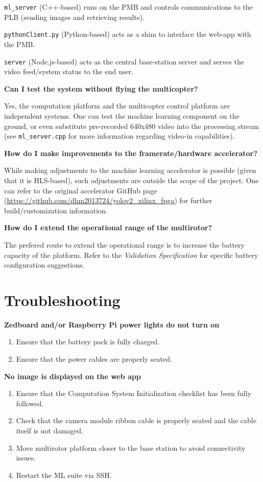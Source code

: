 \documentclass[10pt,letterpaper]{article}
\begin{document}
\texttt{ml\_server} (C++-based) runs on the PMB and controls communications to the PLB (sending images and retrieving results).

\texttt{pythonClient.py} (Python-based) acts as a shim to interface the web-app with the PMB.

\texttt{server} (Node.js-based) acts as the central base-station server and serves the video feed/system status to the end user.

\textbf{Can I test the system without flying the multicopter?}

Yes, the computation platform and the multicopter control platform are independent systems. One can test the machine learning component on the ground, or even substitute pre-recorded 640x480 video into the processing stream (see \texttt{ml\_server.cpp} for more information regarding video-in capabilities).

\textbf{How do I make improvements to the framerate/hardware accelerator?}

While making adjustments to the machine learning accelerator is possible (given that it is HLS-based), such adjustments are outside the scope of the project. One can refer to the original accelerator GitHub page (\url{https://github.com/dhm2013724/yolov2_xilinx_fpga}) for further build/customization information.

\textbf{How do I extend the operational range of the multirotor?}

The prefered route to extend the operational range is to increase the battery capacity of the platform. Refer to the \textit{Validation Specification} for specific battery configuration suggestions.

\section{Troubleshooting}
\textbf{Zedboard and/or Raspberry Pi power lights do not turn on}
\begin{enumerate}
\item Ensure that the battery pack is fully charged.
\item Ensure that the power cables are properly seated.
\end{enumerate}

\textbf{No image is displayed on the web app}
\begin{enumerate}
\item Ensure that the Computation System Initialization checklist has been fully followed.
\item Check that the camera module ribbon cable is properly seated and the cable itself is not damaged.
\item Move multirotor platform closer to the base station to avoid connectivity issues.
\item Restart the ML suite via SSH.
\end{enumerate}
\end{document}
